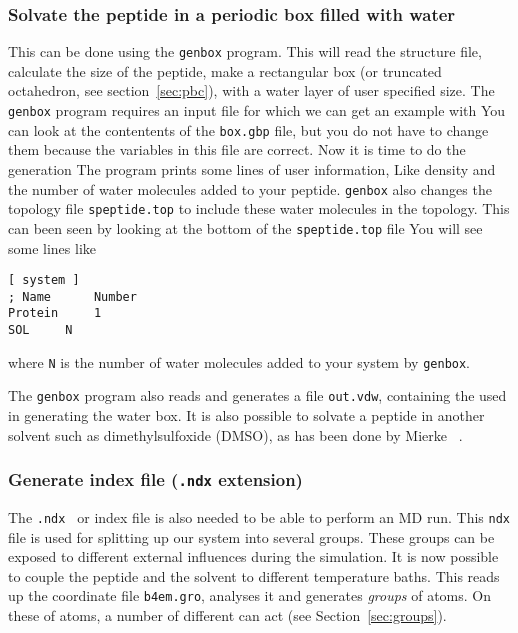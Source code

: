 \subsubsection{Solvate the peptide in a periodic box filled with water}
This can be done using the {\tt genbox} program. This will read the
structure file, calculate the size of the peptide, make a rectangular
box (or truncated octahedron, see section~\ref{sec:pbc}), 
with a water layer of user specified size. The {\tt genbox} program
requires an input file for which we can get an example with 
You can look at the contentents of the {\tt box.gbp} file, but
you do not have to change them because the variables in this file are
correct. Now it is time to do the generation
The program prints some lines of user information, Like density and
the number of water molecules added to your peptide. {\tt genbox} also
changes the topology file {\tt speptide.top} to include these water
molecules in the topology. This can been seen by looking at the bottom
of the {\tt speptide.top} file 
You will see some lines like 
\begin{verbatim}
[ system ]
; Name		Number
Protein		1
SOL		N
\end{verbatim}
where {\tt N} is the number of water molecules added to your system by
{\tt genbox}. 

The {\tt genbox} program also reads and generates a file {\tt out.vdw},
containing the  
used in generating the water box. It
is also possible to solvate a peptide in another solvent such as
dimethylsulfoxide (DMSO), as has been done by Mierke {\etal}~\cite{Mierke91}.  

\subsubsection{Generate index file ({\tt .ndx} extension)}
The {\tt .ndx } or index file is also needed to be able to perform an
MD run. This {\tt ndx} file is used for splitting up our system into
several groups. These groups can be exposed to different external
influences during the simulation. It is now possible to couple the
peptide and the solvent to different temperature baths.
This reads up the coordinate file {\tt b4em.gro}, 
analyses it and generates {\em groups} of atoms. On these 
of atoms, a number of different  can act
(see Section~\ref{sec:groups}). 

